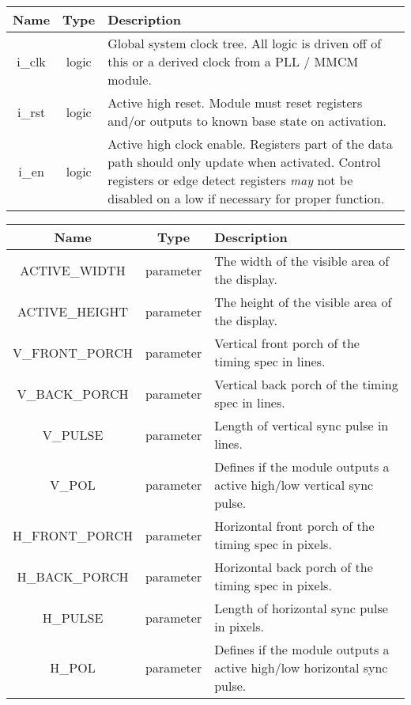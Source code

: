 \documentclass[12pt]{article}
\begin{document}
\begingroup
{}
\label{tab:input_common}
\begin{tabularx}{\linewidth}{ ||c|c|X|| }
    \hline
    Name & Type & Description \\
    \hline
    i\_clk & logic & Global system clock tree. All logic is driven off of this
    or a derived clock from a PLL / MMCM module. \\
    i\_rst & logic & Active high reset. Module must reset registers and/or
    outputs to known base state on activation. \\
    i\_en   & logic & Active high clock enable. Registers part of the data path
    should only update when activated. Control registers or edge detect
    registers \emph{may} not be disabled on a low if necessary for proper function. \\
    \hline
\end{tabularx}
\endgroup

\newpage
\begingroup
{}
\label{tab:input_vtg}
\begin{tabularx}{\linewidth}{ ||c|c|X|| }
    \hline
    Name & Type & Description \\
    \hline
    ACTIVE\_WIDTH & parameter & The width of the visible area of the display. \\
    ACTIVE\_HEIGHT & parameter & The height of the visible area of the display.
    \\
    V\_FRONT\_PORCH & parameter & Vertical front porch of the timing spec in
    lines. \\
    V\_BACK\_PORCH & parameter & Vertical back porch of the timing spec in
    lines. \\
    V\_PULSE & parameter & Length of vertical sync pulse in lines. \\
    V\_POL & parameter & Defines if the module outputs a active high/low
    vertical sync pulse. \\
    H\_FRONT\_PORCH & parameter & Horizontal front porch of the timing spec in
    pixels. \\
    H\_BACK\_PORCH & parameter & Horizontal back porch of the timing spec in
    pixels. \\
    H\_PULSE & parameter & Length of horizontal sync pulse in pixels. \\
    H\_POL & parameter & Defines if the module outputs a active high/low
    horizontal sync pulse. \\
    \hline
\end{tabularx}
\endgroup
\end{document}
